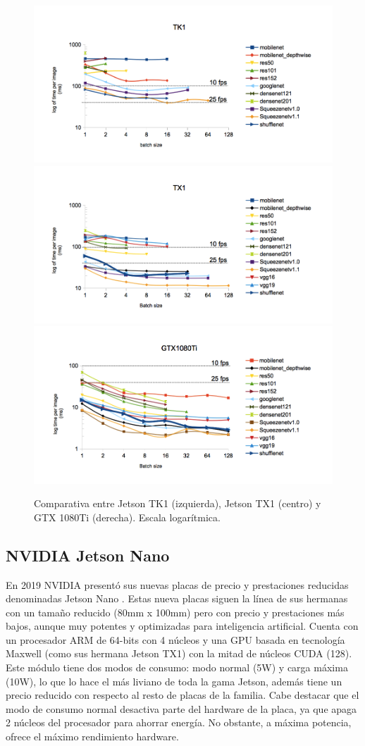 \begin{figure}[htp]
    \centering
    \captionsetup{justification=centering}
    \includegraphics[width=.33\textwidth]{img/TK1_log.png}\hfill
    \includegraphics[width=.33\textwidth]{img/TX1_log.png}\hfill
    \includegraphics[width=.33\textwidth]{img/gtx1080_log.png}
    \caption{Comparativa entre Jetson TK1 (izquierda), Jetson TX1 (centro) y GTX 1080Ti (derecha). Escala logarítmica.}
    \label{fig:ben_tk1_comp_1080}
\end{figure}

\subsection{NVIDIA Jetson Nano}
\label{sec:jnano}

En 2019 NVIDIA presentó sus nuevas placas de precio y prestaciones reducidas denominadas Jetson Nano \cite{jetsonnano}. Estas nueva placas siguen la línea de sus hermanas con un tamaño reducido (80mm x 100mm) pero con precio y prestaciones más bajos, aunque muy potentes y optimizadas para inteligencia artificial. Cuenta con un procesador ARM de 64-bits con 4 núcleos y una GPU basada en tecnología Maxwell (como sus hermana Jetson TX1) con la mitad de núcleos CUDA (128). Este módulo tiene dos modos de consumo: modo normal (5W) y carga máxima (10W), lo que lo hace el más liviano de toda la gama Jetson, además tiene un precio reducido con respecto al resto de placas de la familia. Cabe destacar que el modo de consumo normal desactiva parte del hardware de la placa, ya que apaga 2 núcleos del procesador para ahorrar energía. No obstante, a máxima potencia, ofrece el máximo rendimiento hardware.

